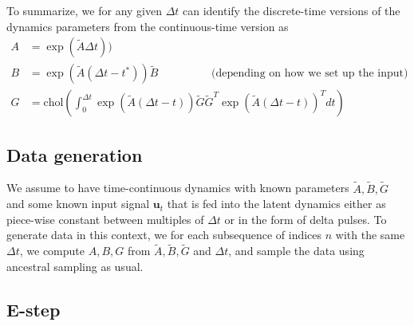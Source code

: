 \documentclass[10pt,letterpaper]{article}
\newcommand{\ub}{\mathbf{u}}
\begin{document}
\noindent{}To summarize, we for any given $\Delta{}t$ can identify the discrete-time versions of the dynamics parameters from the continuous-time version as
\begin{align}
A &= \exp(\tilde{A} \Delta{}t)) \\
B &= \exp(\tilde{A}(\Delta{}t-t^*))\tilde{B} \hspace{2cm} \mbox{(depending on how we set up the input)}\\
G &= \mbox{chol}\left( \int_0^{\Delta{}t} \exp(\tilde{A}(\Delta{}t - t)) \tilde{G}\tilde{G}^T  \exp(\tilde{A}(\Delta{}t - t))^T dt \right) 
\end{align}

\subsection{Data generation}
We assume to have time-continuous dynamics with known parameters $\tilde{A}, \tilde{B}, \tilde{G}$ and some known input signal $\ub_t$ that is fed into the latent dynamics either as piece-wise constant between multiples of $\Delta{}t$ or in the form of delta pulses. To generate data in this context, we for each subsequence of indices $n$ with the same $\Delta{}t$, we compute $A, B, G$ from $\tilde{A}, \tilde{B}, \tilde{G}$ and $\Delta{}t$, and sample the data using ancestral sampling as usual. 

\subsection{E-step}
\end{document}
